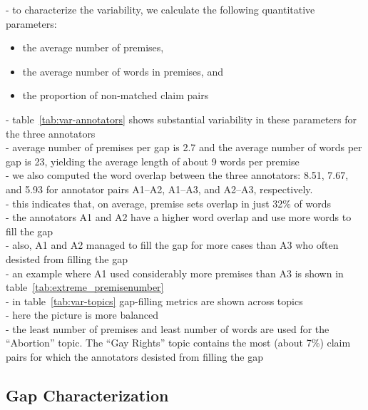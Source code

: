 - to characterize the variability, we calculate the following quantitative parameters:
\begin{itemize}
\item the average number of premises, 
\item the average number of words in premises, and
\item the proportion of non-matched claim pairs
\end{itemize}
- table~\ref{tab:var-annotators} shows substantial variability in these parameters for the three
annotators \\
- average number of premises per gap is 2.7 and the average number of words per gap is 23, 
yielding the average length of about 9 words per premise \\
- we also computed the word overlap between the three annotators: 8.51, 7.67, and 5.93 
for annotator pairs A1--A2, A1--A3, and A2--A3, respectively. \\
- this indicates that, on average, premise sets overlap in just 32\% of words \\
- the annotators A1 and A2 have a higher word overlap and use more words to fill the gap \\
- also, A1 and A2 managed to fill the gap for more cases than A3 who 
often desisted from filling the gap \\
- an example where A1 used considerably more premises than A3 is shown in 
table~\ref{tab:extreme_premisenumber} \\
- in table~\ref{tab:var-topics} gap-filling metrics are shown across topics \\
- here the picture is more balanced \\
- the least number of premises and least number of words are used for the ``Abortion''
topic. The ``Gay Rights'' topic contains the most (about 7\%) claim pairs for which the 
annotators desisted from filling the gap \\

\subsection{Gap Characterization}

